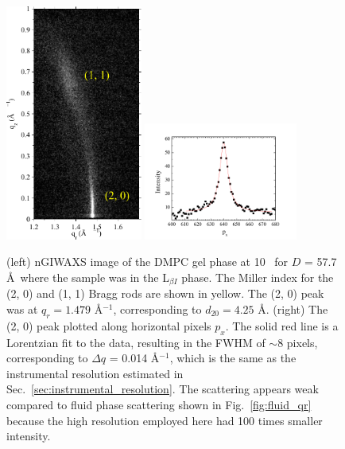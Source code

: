 \begin{figure}[htbp]
  \centering
  \includegraphics[width=0.4\textwidth]{figures/ripple/nGIWAXS/dmpc1_107}
  \qquad
  \includegraphics[trim=50 0 50 0,clip,width=0.45\textwidth]{figures/ripple/nGIWAXS/dmpc1_107_gel_phase_20_swath_8px}
  \caption[nGIWAXS of the DMPC gel phase]{(left) nGIWAXS image of the DMPC gel phase
  at 10 \textcelsius\ for $D$ = 57.7 \AA\ where the sample was in the 
  L$_{\beta I}$ phase. The Miller index for the (2, 0) and (1, 1) Bragg rods
  are shown in yellow. The (2, 0) peak was at
  $q_r=1.479$ \AA$^{-1}$, corresponding to $d_{20}=4.25$ \AA.
  (right) The (2, 0) peak plotted along horizontal pixels $p_x$. The solid red
  line is a Lorentzian fit to the data, resulting in the FWHM of $\sim$8 pixels,
  corresponding to $\Delta q$ = 0.014 \AA$^{-1}$,
  which is the same as the instrumental resolution 
  estimated in Sec.~\ref{sec:instrumental_resolution}.
  The scattering appears weak compared to fluid phase scattering shown in 
  Fig.~\ref{fig:fluid_qr} because the high resolution employed here had 100 
  times smaller intensity.}
  \label{fig:gel_phase}  
\end{figure}

